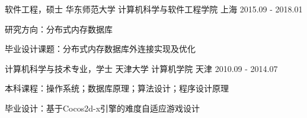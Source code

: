 \begin{cventries}
  \cventry
    {软件工程，硕士}
    {华东师范大学 \quad 计算机科学与软件工程学院}
    {上海}
    {2015.09 - 2018.01}
    {
      \begin{cvitems}
        \item {研究方向：分布式内存数据库}
        \item {毕业设计课题：分布式内存数据库外连接实现及优化}
      \end{cvitems}
    }
    \cventry
    {计算机科学与技术专业，学士}
    {天津大学 \quad 计算机学院}
    {天津}
    {2010.09 - 2014.07}
    {
      \begin{cvitems}
	\item {本科课程：操作系统；数据库原理；算法设计；程序设计原理}
        \item {毕业设计：基于Cocos2d-x引擎的难度自适应游戏设计}
      \end{cvitems}
    }
\end{cventries}
